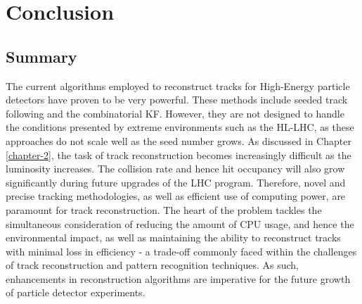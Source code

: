 

\chapter{Conclusion}
\label{chapter-8}





\section{Summary}



The current algorithms employed to reconstruct tracks for High-Energy particle detectors have proven to be very powerful. These methods include seeded track following and the combinatorial KF. However, they are not designed to handle the conditions presented by extreme environments such as the HL-LHC, as these approaches do not scale well as the seed number grows. As discussed in Chapter \ref{chapter-2}, the task of track reconstruction becomes increasingly difficult as the luminosity increases. The collision rate and hence hit occupancy will also grow significantly during future upgrades of the LHC program. Therefore, novel and precise tracking methodologies, as well as efficient use of computing power, are paramount for track reconstruction. The heart of the problem tackles the simultaneous consideration of reducing the amount of CPU usage, and hence the environmental impact, as well as maintaining the ability to reconstruct tracks with minimal loss in efficiency - a trade-off commonly faced within the challenges of track reconstruction and pattern recognition techniques. As such, enhancements in reconstruction algorithms are imperative for the future growth of particle detector experiments. 

